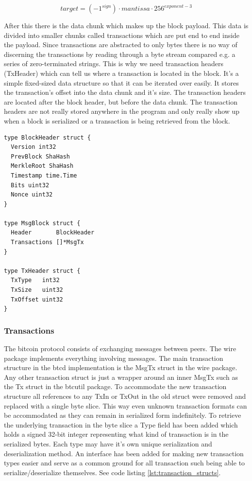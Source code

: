 \documentclass[12pt]{article}
\begin{document}
\begin{equation}\label{eq:bits_to_target}
\mathit{target} = (-1^{\mathit{sign}}) \cdot \mathit{mantissa} \cdot 256^{\mathit{exponent-3}}
\end{equation}

After this there is the data chunk which makes up the block payload. This data is divided into smaller chunks called transactions which are put end to end inside the payload. Since transactions are abstracted to only bytes there is no way of discerning the transactions by reading through a byte stream compared e.g. a series of zero-terminated strings. This is why we need transaction headers (TxHeader) which can tell us where a transaction is located in the block. It's a simple fixed-sized data structure so that it can be iterated over easily. It stores the transaction's offset into the data chunk and it's size. The transaction headers are located after the block header, but before the data chunk. The transaction headers are not really stored anywhere in the program and only really show up when a block is serialized or a transaction is being retrieved from the block.
\begin{lstlisting}[float=h!,caption={Block Structure},label=lst:block_structs]
type BlockHeader struct {
  Version int32
  PrevBlock ShaHash
  MerkleRoot ShaHash
  Timestamp time.Time
  Bits uint32
  Nonce uint32
}

type MsgBlock struct {
  Header       BlockHeader
  Transactions []*MsgTx
}

type TxHeader struct {
  TxType   int32
  TxSize   uint32
  TxOffset uint32
}
\end{lstlisting}

\subsubsection{Transactions}\label{subsec:transactions}
The bitcoin protocol consists of exchanging messages between peers. The wire package implements everything involving messages. The main transaction structure in the btcd implementation is the MsgTx struct in the wire package. Any other transaction struct is just a wrapper around an inner MsgTx such as the Tx struct in the btcutil package.
 To accommodate the new transaction structure all references to any TxIn or 
TxOut in the old struct were removed and replaced with a single byte slice. This way even unknown transaction formats can be accommodated as they can remain in serialized form indefinitely. To retrieve the underlying transaction in the byte slice a Type field has been added which holds a signed 32-bit integer representing what kind of transaction is in the serialized bytes. Each type may have it's own unique serialization and deserialization method. An interface has been added for making new transaction types easier and serve as a common ground for all transaction such being able to serialize/deserialize themselves. See code listing \ref{lst:transaction_structs}.
\end{document}
